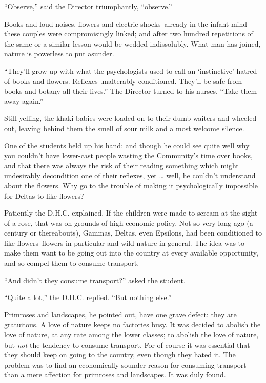 \documentclass[12pt]{report}
\begin{document}
``Observe,'' said the Director triumphantly, ``observe.''

Books and loud noises, flowers and electric shocks--already in the
infant mind these couples were compromisingly linked; and after two
hundred repetitions of the same or a similar lesson would be wedded
indissolubly. What man has joined, nature is powerless to put asunder.

``They'll grow up with what the psychologists used to call an
`instinctive' hatred of books and flowers. Reflexes unalterably
conditioned. They'll be safe from books and botany all their lives.''
The Director turned to his nurses. ``Take them away again.''

Still yelling, the khaki babies were loaded on to their dumb-waiters and
wheeled out, leaving behind them the smell of sour milk and a most
welcome silence.

One of the students held up his hand; and though he could see quite well
why you couldn't have lower-cast people wasting the Community's time
over books, and that there was always the risk of their reading
something which might undesirably decondition one of their reflexes, yet
\ldots{} well, he couldn't understand about the flowers. Why go to the
trouble of making it psychologically impossible for Deltas to like
flowers?

Patiently the D.H.C. explained. If the children were made to scream at
the sight of a rose, that was on grounds of high economic policy. Not so
very long ago (a century or thereabouts), Gammas, Deltas, even Epsilons,
had been conditioned to like flowers--flowers in particular and wild
nature in general. The idea was to make them want to be going out into
the country at every available opportunity, and so compel them to
consume transport.

``And didn't they consume transport?'' asked the student.

``Quite a lot,'' the D.H.C. replied. ``But nothing else.''

Primroses and landscapes, he pointed out, have one grave defect: they
are gratuitous. A love of nature keeps no factories busy. It was decided
to abolish the love of nature, at any rate among the lower classes; to
abolish the love of nature, but \emph{not} the tendency to consume
transport. For of course it was essential that they should keep on going
to the country, even though they hated it. The problem was to find an
economically sounder reason for consuming transport than a mere
affection for primroses and landscapes. It was duly found.
\end{document}

